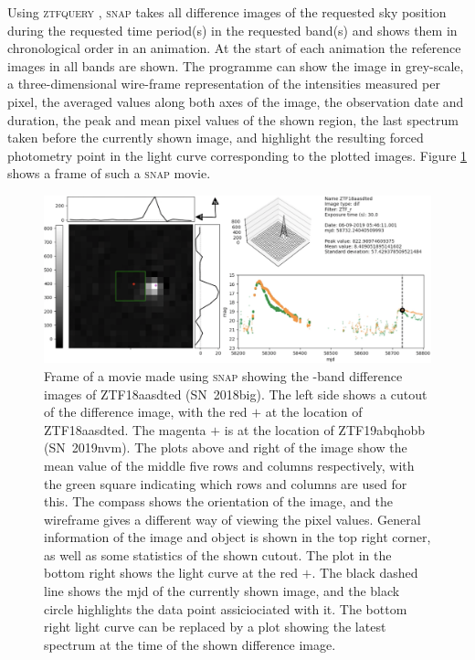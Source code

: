 \documentclass[a4paper,oneside,12pt, class=Latex/Classes/PhDthesisPSnPDF, crop=false]{standalone}
\begin{document}
Using \textsc{ztfquery} \citep{ZTFquery}, \textsc{snap} takes all difference images of the requested sky position during the requested time period(s) in the requested band(s) and shows them in chronological order in an animation. At the start of each animation the reference images in all bands are shown. The programme can show the image in grey-scale, a three-dimensional wire-frame representation of the intensities measured per pixel, the averaged values along both axes of the image, the observation date and duration, the peak and mean pixel values of the shown region, the last spectrum taken before the currently shown image, and highlight the resulting forced photometry point in the light curve corresponding to the plotted images. Figure \ref{snap_showcase} shows a frame of such a \textsc{snap} movie.

\begin{figure}
 \centering
 \includegraphics[width=\textwidth]{../Images/chapter_3/snap_showcase.png}
 \caption{Frame of a movie made using \textsc{snap} showing the \ztfr-band difference images of ZTF18aasdted (SN~2018big). The left side shows a cutout of the difference image, with the red $\plus$ at the location of ZTF18aasdted. The magenta $\plus$ is at the location of ZTF19abqhobb (SN~2019nvm). The plots above and right of the image show the mean value of the middle five rows and columns respectively, with the green square indicating which rows and columns are used for this. The compass shows the orientation of the image, and the wireframe gives a different way of viewing the pixel values. General information of the image and object is shown in the top right corner, as well as some statistics of the shown cutout. The plot in the bottom right shows the light curve at the red $\plus$. The black dashed line shows the mjd of the currently shown image, and the black circle highlights the data point assiciociated with it. The bottom right light curve can be replaced by a plot showing the latest spectrum at the time of the shown difference image.}
 \label{snap_showcase}
\end{figure}
\end{document}
